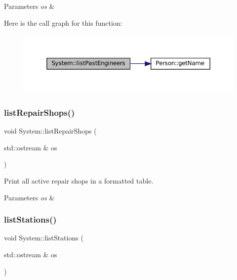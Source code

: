 \begin{DoxyParams}{Parameters}
{\em os} & \\
\hline
\end{DoxyParams}
Here is the call graph for this function\+:
\nopagebreak
\begin{figure}[H]
\begin{center}
\leavevmode
\includegraphics[width=350pt]{classSystem_afd19a30636955896bc6dd59d9a4ca20e_cgraph}
\end{center}
\end{figure}
\mbox{\label{classSystem_ac6e7530d7bde96b46e6db061ed139096}} 
\subsubsection{\texorpdfstring{list\+Repair\+Shops()}{listRepairShops()}}
{\footnotesize\ttfamily void System\+::list\+Repair\+Shops (\begin{DoxyParamCaption}\item[{std\+::ostream \&}]{os }\end{DoxyParamCaption})}

Print all active repair shops in a formatted table.


\begin{DoxyParams}{Parameters}
{\em os} & \\
\hline
\end{DoxyParams}
\mbox{\label{classSystem_a06041827a7b47ad06eee9d121e42590c}} 
\subsubsection{\texorpdfstring{list\+Stations()}{listStations()}}
{\footnotesize\ttfamily void System\+::list\+Stations (\begin{DoxyParamCaption}\item[{std\+::ostream \&}]{os }\end{DoxyParamCaption})}



